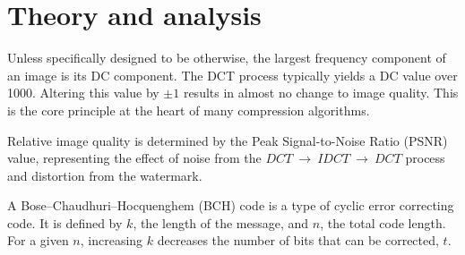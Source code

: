 \section{Theory and analysis}\label{sec:t-and-a}
Unless specifically designed to be otherwise, the largest frequency component of an image is its DC component.
The DCT process typically yields a DC value over 1000. Altering this value by $\pm 1$ results in almost no change to image quality.
This is the core principle at the heart of many compression algorithms.\citeneeded{}

Relative image quality is determined by the Peak Signal-to-Noise Ratio (PSNR) value, representing the effect of noise from the $DCT~\rightarrow~IDCT~\rightarrow~DCT$ process and distortion from the watermark.

A Bose–Chaudhuri–Hocquenghem (BCH) code is a type of cyclic error correcting code.
It is defined by $k$, the length of the message, and $n$, the total code length.
For a given $n$, increasing $k$ decreases the number of bits that can be corrected, $t$.
